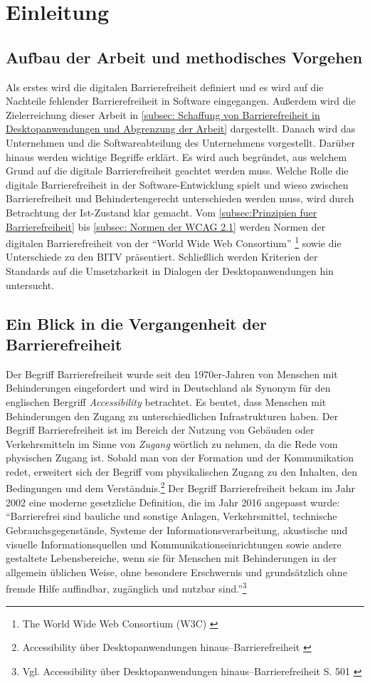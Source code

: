 \section{Einleitung}

\subsection{Aufbau der Arbeit und methodisches Vorgehen}
Als erstes wird die digitalen Barrierefreiheit definiert und es wird auf die Nachteile fehlender Barrierefreiheit in Software eingegangen. Außerdem wird die Zielerreichung dieser Arbeit in \cref{subsec: Schaffung von Barrierefreiheit in Desktopanwendungen und Abgrenzung der Arbeit} dargestellt. Danach wird das Unternehmen und die Softwareabteilung des Unternehmens vorgestellt. Darüber hinaus werden wichtige Begriffe erklärt. Es wird auch begründet, aus welchem Grund auf die digitale Barrierefreiheit geachtet werden muss. Welche Rolle die digitale Barrierefreiheit in der Software-Entwicklung spielt und wieso zwischen Barrierefreiheit und Behindertengerecht unterschieden werden muss, wird durch Betrachtung der Ist-Zustand klar gemacht. Vom \cref{subsec:Prinzipien fuer Barrierefreiheit} bis \cref{subsec: Normen der WCAG 2.1} werden Normen der digitalen Barrierefreiheit von der "`World Wide Web Consortium"' \footnote{The World Wide Web Consortium (W3C) \cite{w3c}} sowie die Unterschiede zu den \ac{BITV} präsentiert. Schließlich werden Kriterien der Standards auf die Umsetzbarkeit in Dialogen der Desktopanwendungen hin untersucht.

\subsection{Ein Blick in die Vergangenheit der Barrierefreiheit}
Der Begriff Barrierefreiheit wurde seit den 1970er-Jahren von Menschen mit Behinderungen eingefordert und wird in Deutschland als Synonym für den englischen Bergriff \textit{Accessibility} betrachtet. Es beutet, dass Menschen mit Behinderungen den Zugang zu unterschiedlichen Infrastrukturen haben. Der Begriff Barrierefreiheit ist im Bereich der Nutzung von Gebäuden oder Verkehrsmitteln im Sinne von \textit{Zugang} wörtlich zu nehmen, da die Rede vom physischen Zugang ist. Sobald man von der Formation und der Kommunikation redet, erweitert sich der Begriff vom physikalischen Zugang zu den Inhalten, den Bedingungen und dem Verständnis.\footnote{Accessibility über Desktopanwendungen hinaus–Barrierefreiheit \cite{buhler2017accessibility}} Der Begriff Barrierefreiheit bekam im Jahr 2002 eine moderne gesetzliche Definition, die im Jahr 2016 angepasst wurde: "`Barrierefrei sind bauliche und sonstige Anlagen, Verkehrsmittel, technische Gebrauchsgegenstände, Systeme der Informationsverarbeitung, akustische und visuelle Informationsquellen und Kommunikationseinrichtungen sowie andere gestaltete Lebensbereiche, wenn sie für Menschen mit Behinderungen in der allgemein üblichen Weise, ohne besondere Erschwernis und grundsätzlich ohne fremde Hilfe auffindbar, zugänglich und nutzbar sind."'\footnote{Vgl. Accessibility über Desktopanwendungen hinaus–Barrierefreiheit S. 501 \cite{buhler2017accessibility}}

